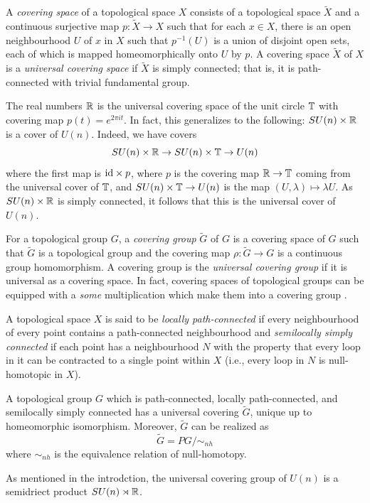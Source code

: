 \documentclass{amsart}
\begin{document}
A \emph{covering space} of a topological space $X$ consists of a topological space $\tilde{X}$ and a continuous surjective map $p: \tilde{X} \to X$ such that for each $x \in X$, there is an open neighbourhood $U$ of $x$ in $X$ such that $p^{-1}(U)$ is a union of disjoint open sets, each of which is mapped homeomorphically onto $U$ by $p$.
A covering space $\tilde{X}$ of $X$ is a \emph{universal covering space} if $\tilde{X}$ is simply connected; that is, it is path-connected with trivial fundamental group. 

  \begin{example}
  The real numbers $\mathbb{R}$ is the universal covering space of the unit circle $\mathbb{T}$ with covering map $p(t) = e^{2\pi i t}$. In fact, this generalizes to the following: $SU(n) \times \mathbb{R}$   is a cover of $U(n)$.
  Indeed, we have covers
  \begin{equation}
  SU(n) \times \mathbb{R} \to SU(n) \times \mathbb{T} \to U(n)
  \end{equation}
  where the first map is $\text{id} \times p$, where $p$ is the covering map $\mathbb{R} \to \mathbb{T}$ coming from the universal cover of $\mathbb{T}$, and $SU(n) \times \mathbb{T} \to U(n)$ is the map $(U,\lambda) \mapsto \lambda U$. 
  As $SU(n) \times \mathbb{R}$ is simply connected, it follows that this is the universal cover of $U(n)$. 
  \end{example}  

  For a topological group $G$, a \emph{covering group} $\widetilde{G}$ of $G$ is a covering space of $G$ such that $\widetilde{G}$ is a topological group and the covering map $\rho: \widetilde{G} \to G$ is a continuous group homomorphism.
  A covering group is the \emph{universal covering group} if it is universal as a covering space. In fact, covering spaces of topological groups can be equipped with a \emph{some} multiplication which make them into a covering group \cite[Theorem 10.42]{RotmanATBook}.
  
  A topological space $X$ is said to be \emph{locally path-connected} if every neighbourhood of every point contains a path-connected neighbourhood and \emph{semilocally simply connected} if each point has a neighbourhood $N$ with the property that every loop in it can be contracted to a single point within $X$ (i.e., every loop in $N$ is null-homotopic in $X$). 
  
  \begin{theorem}
    A topological group $G$ which is path-connected, locally path-connected, and semilocally simply connected has a universal covering $\widetilde{G}$, unique up to homeomorphic isomorphism. Moreover, $\tilde{G}$ can be realized as
  \begin{equation}
  \widetilde{G} = PG/\sim_{nh}
  \end{equation}
  where $\sim_{nh}$ is the equivalence relation of null-homotopy. 
  \end{theorem}
  As mentioned in the introdction, the universal covering group of $U(n)$ is a semidriect product $SU(n) \rtimes \mathbb{R}$.  
\end{document}
